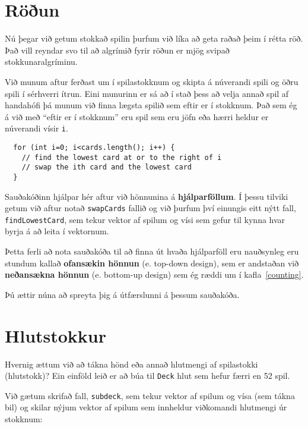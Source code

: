 
\section{Röðun}
\label{sorting}

Nú þegar við getum stokkað spilin þurfum við líka að geta raðað þeim í rétta röð.
Það vill reyndar svo til að algrímið fyrir röðun er mjög svipað stokkunaralgríminu.

Við munum aftur ferðast um í spilastokknum og skipta á núverandi spili og öðru spili í sérhverri ítrun.
Eini munurinn er sá að í stað þess að velja annað spil af handahófi þá munum við finna lægsta spilið sem eftir er í stokknum.
Það sem ég á við með ``eftir er í stokknum'' eru spil sem eru jöfn eða hærri heldur er núverandi vísir {\tt i}.

\begin{verbatim}
  for (int i=0; i<cards.length(); i++) {
    // find the lowest card at or to the right of i
    // swap the ith card and the lowest card
  }
\end{verbatim}
%
Sauðakóðinn hjálpar hér aftur við hönnunina á {\bf hjálparföllum}.
Í þessu tilviki getum við aftur notað {\tt swapCards} fallið og við þurfum því einungis eitt nýtt fall, {\tt findLowestCard},
sem tekur vektor af spilum og vísi sem gefur til kynna hvar byrja á að leita í vektornum.

Þetta ferli að nota sauðakóða til að finna út hvaða hjálparföll eru nauðsynleg eru stundum kallað 
{\bf ofansækin hönnun} (e. top-down design), sem er andstaðan við {\bf neðansækna hönnun} (e. bottom-up design) sem ég ræddi um í kafla~\ref{counting}.


Þú ættir núna að spreyta þig á útfærslunni á þessum sauðakóða.

\section {Hlutstokkur}

Hvernig ættum við að tákna hönd eða annað hlutmengi af spilastokki (hlutstokk)?
Ein einföld leið er að búa til {\tt Deck} hlut sem hefur færri en 52 spil. 

Við gætum skrifað fall, {\tt subdeck}, sem tekur vektor af spilum og vísa (sem tákna bil)
og skilar nýjum vektor af spilum sem innheldur viðkomandi hlutmengi úr stokknum:

